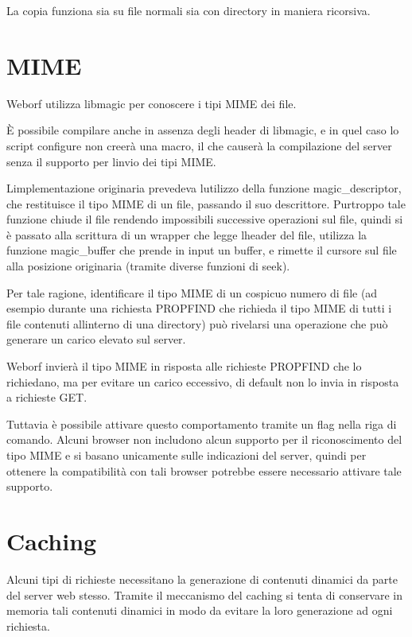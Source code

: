 \documentclass[a4paper,11pt]{article}
\begin{document}
{\sffamily
La copia funziona sia su file normali sia con directory in maniera
ricorsiva.}


\bigskip

\section{MIME}
{\sffamily
Weborf utilizza libmagic per conoscere i tipi MIME dei file.}

{\sffamily
\`E possibile compilare anche in assenza degli header di libmagic, e in
quel caso lo script configure non creer\`a una macro, il che causer\`a
la compilazione del server senza il supporto per
l{\textquotesingle}invio dei tipi MIME.}


\bigskip

{\sffamily
L{\textquotesingle}implementazione originaria prevedeva
l{\textquotesingle}utilizzo della funzione magic\_descriptor, che
restituisce il tipo MIME di un file, passando il suo descrittore.
Purtroppo tale funzione chiude il file rendendo impossibili successive
operazioni sul file, quindi si \`e passato alla scrittura di un wrapper
che legge l{\textquotesingle}header del file, utilizza la funzione
magic\_buffer che prende in input un buffer, e rimette il cursore sul
file alla posizione originaria (tramite diverse funzioni di seek).}

{\sffamily
Per tale ragione, identificare il tipo MIME di un cospicuo numero di
file (ad esempio durante una richiesta PROPFIND che richieda il tipo
MIME di tutti i file contenuti all{\textquotesingle}interno di una
directory) pu\`o rivelarsi una operazione che pu\`o generare un carico
elevato sul server.}


\bigskip

{\sffamily
Weborf invier\`a il tipo MIME in risposta alle richieste PROPFIND che lo
richiedano, ma per evitare un carico eccessivo, di default non lo invia
in risposta a richieste GET.}

{\sffamily
Tuttavia \`e possibile attivare questo comportamento tramite un flag
nella riga di comando. Alcuni browser non includono alcun supporto per
il riconoscimento del tipo MIME e si basano unicamente sulle
indicazioni del server, quindi per ottenere la compatibilit\`a con tali
browser potrebbe essere necessario attivare tale supporto.}


\bigskip

\section{Caching}
{\sffamily
Alcuni tipi di richieste necessitano la generazione di contenuti
dinamici da parte del server web stesso. Tramite il meccanismo del
caching si tenta di conservare in memoria tali contenuti dinamici in
modo da evitare la loro generazione ad ogni richiesta.}
\end{document}

